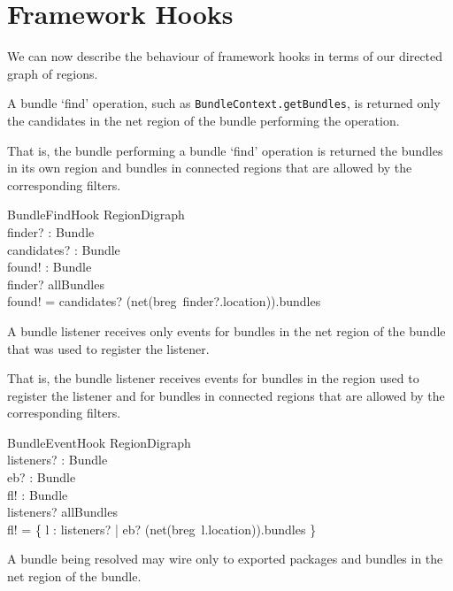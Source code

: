 \documentclass[a4paper,9pt,twoside]{article}
\begin{document}
\clearpage
\section{Framework Hooks}
\label{cha:fhooks}

We can now describe the behaviour of framework hooks in terms of our directed graph of regions.

A bundle `find' operation, such as \texttt{BundleContext.getBundles}, is returned only the
candidates in the net region of the bundle performing the operation.

That is, the bundle performing a bundle `find' operation is returned the bundles in its own region
and bundles in connected regions that are allowed by the corresponding filters.
\begin{schema}{BundleFindHook}
  \Xi RegionDigraph \\
  finder? : Bundle \\
  candidates? : \power Bundle \\
  found! : \power Bundle \\
\where
  finder? \in allBundles \\
  found! = candidates? \cap (net(breg~finder?.location)).bundles \\
\end{schema}

A bundle listener receives only events for bundles in the net region of the bundle that was used
to register the listener.

That is, the bundle listener receives events for bundles in the region used to register the listener
and for bundles in connected regions that are allowed by the corresponding filters.
\begin{schema}{BundleEventHook}
  \Xi RegionDigraph \\
  listeners? : \power Bundle \\
  eb? : Bundle \\
  fl! : \power Bundle \\
\where
  listeners? \subseteq allBundles \\
  fl! = \{ l : listeners? | eb? \in (net(breg~l.location)).bundles \} \\
\end{schema}

A bundle being resolved may wire only to exported packages and bundles in the net region of the
bundle.
\end{document}
